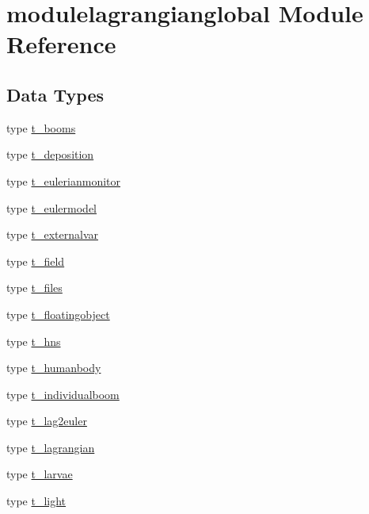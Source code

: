\hypertarget{namespacemodulelagrangianglobal}{}\section{modulelagrangianglobal Module Reference}
\label{namespacemodulelagrangianglobal}
\subsection*{Data Types}
\begin{DoxyCompactItemize}
\item 
type \mbox{\hyperlink{structmodulelagrangianglobal_1_1t__booms}{t\+\_\+booms}}
\item 
type \mbox{\hyperlink{structmodulelagrangianglobal_1_1t__deposition}{t\+\_\+deposition}}
\item 
type \mbox{\hyperlink{structmodulelagrangianglobal_1_1t__eulerianmonitor}{t\+\_\+eulerianmonitor}}
\item 
type \mbox{\hyperlink{structmodulelagrangianglobal_1_1t__eulermodel}{t\+\_\+eulermodel}}
\item 
type \mbox{\hyperlink{structmodulelagrangianglobal_1_1t__externalvar}{t\+\_\+externalvar}}
\item 
type \mbox{\hyperlink{structmodulelagrangianglobal_1_1t__field}{t\+\_\+field}}
\item 
type \mbox{\hyperlink{structmodulelagrangianglobal_1_1t__files}{t\+\_\+files}}
\item 
type \mbox{\hyperlink{structmodulelagrangianglobal_1_1t__floatingobject}{t\+\_\+floatingobject}}
\item 
type \mbox{\hyperlink{structmodulelagrangianglobal_1_1t__hns}{t\+\_\+hns}}
\item 
type \mbox{\hyperlink{structmodulelagrangianglobal_1_1t__humanbody}{t\+\_\+humanbody}}
\item 
type \mbox{\hyperlink{structmodulelagrangianglobal_1_1t__individualboom}{t\+\_\+individualboom}}
\item 
type \mbox{\hyperlink{structmodulelagrangianglobal_1_1t__lag2euler}{t\+\_\+lag2euler}}
\item 
type \mbox{\hyperlink{structmodulelagrangianglobal_1_1t__lagrangian}{t\+\_\+lagrangian}}
\item 
type \mbox{\hyperlink{structmodulelagrangianglobal_1_1t__larvae}{t\+\_\+larvae}}
\item 
type \mbox{\hyperlink{structmodulelagrangianglobal_1_1t__light}{t\+\_\+light}}

\end{DoxyCompactItemize}
